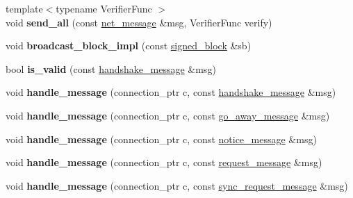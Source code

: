 \begin{DoxyCompactItemize}
{\footnotesize template$<$typename Verifier\+Func $>$ }\\void {\bfseries send\+\_\+all} (const \mbox{\hyperlink{classfc_1_1static__variant}{net\+\_\+message}} \&msg, Verifier\+Func verify)
\item 
\mbox{\label{classaacio_1_1net__plugin__impl_abddbd0e8c6818aa3e632e47278a5d3b7}} 
void {\bfseries broadcast\+\_\+block\+\_\+impl} (const \mbox{\hyperlink{structaacio_1_1chain_1_1signed__block}{signed\+\_\+block}} \&sb)
\item 
\mbox{\label{classaacio_1_1net__plugin__impl_a7f328b59e100e065f2504fd8324f3a5d}} 
bool {\bfseries is\+\_\+valid} (const \mbox{\hyperlink{structaacio_1_1handshake__message}{handshake\+\_\+message}} \&msg)
\item 
\mbox{\label{classaacio_1_1net__plugin__impl_ac24ec68087dca60e0e0821d3f6287e55}} 
void {\bfseries handle\+\_\+message} (connection\+\_\+ptr c, const \mbox{\hyperlink{structaacio_1_1handshake__message}{handshake\+\_\+message}} \&msg)
\item 
\mbox{\label{classaacio_1_1net__plugin__impl_af422531c449a17497ab5e07d562937ec}} 
void {\bfseries handle\+\_\+message} (connection\+\_\+ptr c, const \mbox{\hyperlink{structaacio_1_1go__away__message}{go\+\_\+away\+\_\+message}} \&msg)
\item 
\mbox{\label{classaacio_1_1net__plugin__impl_adc70580d880e291f9ef69463effc885e}} 
void {\bfseries handle\+\_\+message} (connection\+\_\+ptr c, const \mbox{\hyperlink{structaacio_1_1notice__message}{notice\+\_\+message}} \&msg)
\item 
\mbox{\label{classaacio_1_1net__plugin__impl_a2a44edb2fa05e0c547b08b9abfc995e8}} 
void {\bfseries handle\+\_\+message} (connection\+\_\+ptr c, const \mbox{\hyperlink{structaacio_1_1request__message}{request\+\_\+message}} \&msg)
\item 
\mbox{\label{classaacio_1_1net__plugin__impl_ab396cbd64d48a828215ff22bc2041913}} 
void {\bfseries handle\+\_\+message} (connection\+\_\+ptr c, const \mbox{\hyperlink{structaacio_1_1sync__request__message}{sync\+\_\+request\+\_\+message}} \&msg)

\end{DoxyCompactItemize}
